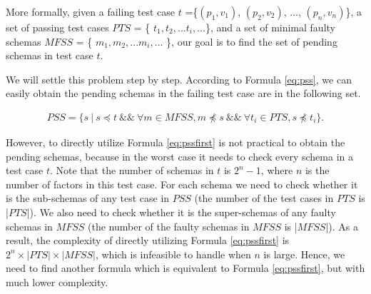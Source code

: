 
More formally,  given a failing test case $t$ =\{$(p_{1}, v_{1})$, $(p_{2}, v_{2})$, ..., $(p_{n}, v_{n})$\},  a set of passing test cases $PTS$ = \{ $t_{1}, t_{2}, ... t_{i}, ...$\}, and a set of minimal faulty schemas $MFSS$ = \{ $m_{1}, m_{2}, ... m_{i}, ...$ \}, our goal is to find the set of pending schemas in test case $t$.


We will settle this problem step by step.  According to Formula \ref{eq:pss}, we can easily obtain the pending schemas in the failing test case are in the following set.


\begin{equation}
\begin{aligned}\label{eq:pssfirst}
PSS=\{ s\ |\ s \preceq t\ \&\&\ \forall m \in MFSS,  m \npreceq s  \ \&\&\  \forall t_{i} \in PTS, s \npreceq t_{i} \} .
\end{aligned}
\end{equation}


However, to directly utilize Formula \ref{eq:pssfirst} is not practical to obtain the pending schemas, because in the worst case it needs to check every schema in a test case $t$. Note that the number of schemas in $t$ is $2^{n} - 1$, where $n$ is the number of factors in this test case. For each schema we need to check whether it is the sub-schemas of any test case in $PSS$ (the number of the test cases in $PTS$ is |$PTS$|). We also need to check whether it is the super-schemas of any faulty schemas in $MFSS$ (the number of the faulty schemas in $MFSS$ is |$MFSS$|). As a result, the complexity of directly utilizing Formula \ref{eq:pssfirst} is $2^{n} \times |PTS| \times |MFSS|$, which is infeasible to handle when $n$ is large. Hence, we need to find another formula which is equivalent to Formula \ref{eq:pssfirst}, but with much lower complexity.

